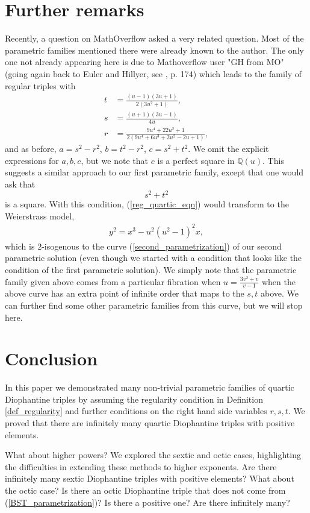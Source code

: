 \documentclass{amsart}
\begin{document}
\section{Further remarks}
Recently, a question on MathOverflow  \cite{mathoverflow_parametric_solutions} asked a very related question. Most of the parametric families mentioned there were already known to the author. The only one not already appearing here is due to Mathoverflow user "GH from MO" (going again back to Euler and Hillyer, see \cite{dickson1920history2}, p. 174) which leads to the family of regular triples with 
\begin{align*}
t &= \frac{(u-1)(3u+1)}{2(3u^2+1)}, \\
s &= \frac{(u+1)(3u-1)}{4u}, \\
r &= \frac{9u^4 + 22u^2 + 1}{2(9u^4 + 6u^3 + 2u^2 - 2u + 1)},
\end{align*}
and as before, $a=s^2-r^2$, $b=t^2-r^2$, $c=s^2+t^2$. We omit the explicit expressions for $a,b,c$, but we note that $c$ is a perfect square in $\mathbb{Q}(u)$. This suggests a similar approach to our first parametric family, except that one would ask that \[s^2+t^2\] is a square. With this condition, (\ref{reg_quartic_eqn}) would transform to the Weierstrass model,
\begin{align*}
    y^2 = x^3-u^2(u^2-1)^2x,
\end{align*}
which is $2$-isogenous to the curve (\ref{second_parametrization}) of our second parametric solution (even though we started with a condition that looks like the condition of the first parametric solution). We simply note that the parametric family given above comes from a particular fibration when $u = \frac{3v^2+v}{v-1}$ when the above curve has an extra point of infinite order that maps to the $s,t$ above. We can further find some other parametric families from this curve, but we will stop here.

\section{Conclusion}
In this paper we demonstrated many non-trivial parametric families of quartic Diophantine triples by assuming the regularity condition in Definition \ref{def_regularity} and further conditions on the right hand side variables $r,s,t$. We proved that there are infinitely many quartic Diophantine triples with positive elements. 

What about higher powers? We explored the sextic and octic cases, highlighting the difficulties in extending these methods to higher exponents. Are there infinitely many sextic Diophantine triples with positive elements? What about the octic case? Is there an octic Diophantine triple that does not come from (\ref{BST_parametrization})? Is there a positive one? Are there infinitely many?
\end{document}
